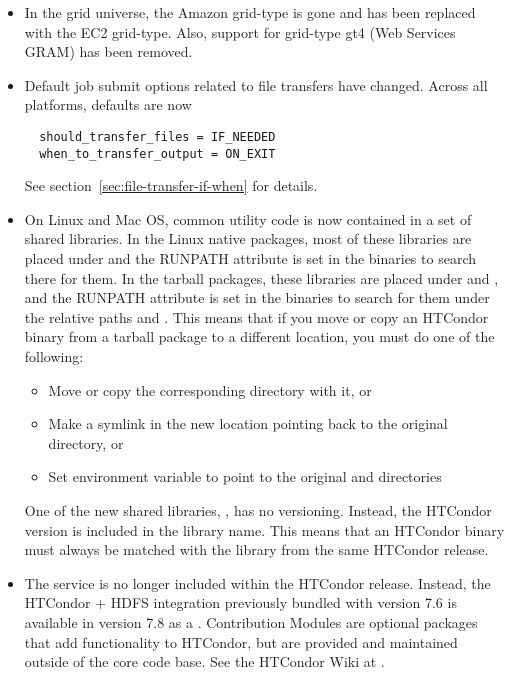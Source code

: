\begin{itemize}

\item In the grid universe, the Amazon grid-type is gone and has been replaced
	with the EC2 grid-type.  Also, support for grid-type gt4 (Web Services
	GRAM) has been removed.

\item Default job submit options related to file transfers have changed. 
Across all platforms, defaults are now
\begin{verbatim}
  should_transfer_files = IF_NEEDED
  when_to_transfer_output = ON_EXIT
\end{verbatim}
See section~\ref{sec:file-transfer-if-when} for details.

\item  On Linux and Mac OS, common utility code is now contained in a set of
shared libraries. In the Linux native packages, most of these libraries
are placed under  and the RUNPATH attribute is set in
the binaries to search there for them.
In the tarball packages, these libraries are placed under  and
, and the RUNPATH attribute is set in the binaries to search
for them under the relative paths  and .
This means that if you move or copy an HTCondor binary from a tarball
package to a different location, you must do one of the following:
\begin{itemize}
	\item Move or copy the corresponding  directory with it, or
  \item Make a symlink in the new location pointing back to the original 
  directory, or
  \item Set environment variable  to point to the original  and 
  directories
\end{itemize}
One of the new shared libraries, , has no 
versioning. Instead, the HTCondor version is included in the library name.
This means that an HTCondor binary must always be matched with the
 library from the same HTCondor release.


\item  The  service is no longer included within the HTCondor
	release.  Instead, the HTCondor + HDFS integration previously bundled with
	version 7.6 is available in version 7.8 as a .
	Contribution Modules are optional packages that add functionality to
	HTCondor, but are provided and maintained outside of the core code base.  See
	the HTCondor Wiki at
	.


\end{itemize}
